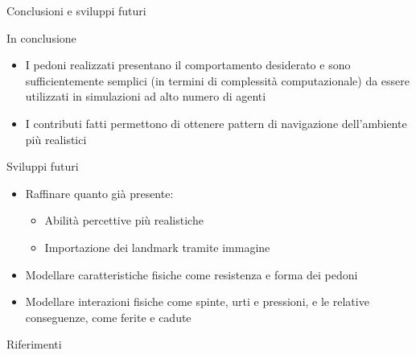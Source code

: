 \documentclass{beamer}
\begin{document}
\begin{frame}{Conclusioni e sviluppi futuri}
\begin{block}{In conclusione}
\begin{itemize}
    \item I pedoni realizzati presentano il comportamento desiderato e sono sufficientemente semplici (in termini di complessità computazionale) da essere utilizzati in simulazioni ad alto numero di agenti
    \item I contributi fatti permettono di ottenere pattern di navigazione dell'ambiente più realistici
\end{itemize}{}
\end{block}
\begin{block}{Sviluppi futuri}
\begin{itemize}
    \item Raffinare quanto già presente:
    \begin{itemize}
        \item Abilità percettive più realistiche
        \item Importazione dei landmark tramite immagine
    \end{itemize}{}
    \item Modellare caratteristiche fisiche come resistenza e forma dei pedoni
    \item Modellare interazioni fisiche come spinte, urti e pressioni, e le relative conseguenze, come ferite e cadute
\end{itemize}{}
\end{block}{}
\end{frame}{}

\begin{frame}{Riferimenti}
    \nocite{*}
    
    
\end{frame}
\end{document}
